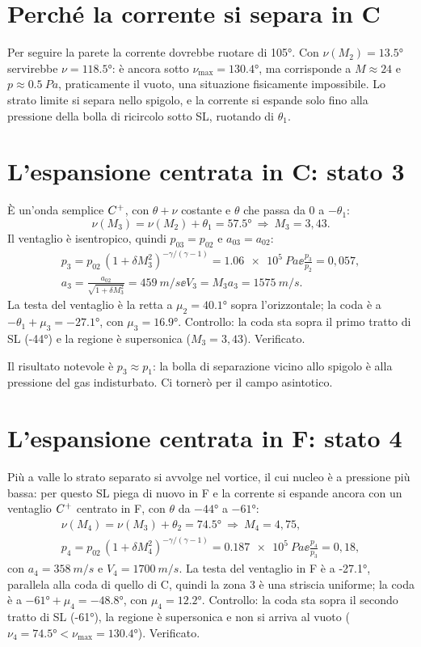 \section*{Perché la corrente si separa in C}
Per seguire la parete la corrente dovrebbe ruotare di \ang{105}. Con $\nu(M_2)=\ang{13.5}$ servirebbe
$\nu=\ang{118.5}$: è ancora sotto $\nu_{\max}=\ang{130.4}$, ma corrisponde a $M\approx24$ e $p\approx\SI{0.5}{Pa}$,
praticamente il vuoto, una situazione fisicamente impossibile. Lo strato limite si separa nello spigolo, e la
corrente si espande solo fino alla pressione della bolla di ricircolo sotto SL, ruotando di $\theta_1$.

\section*{L'espansione centrata in C: stato 3}
È un'onda semplice $C^{+}$, con $\theta+\nu$ costante e $\theta$ che passa da 0 a $-\theta_1$:
\[
\nu(M_3)=\nu(M_2)+\theta_1=\ang{57.5}\ \Rightarrow\ M_3=3{,}43 .
\]
Il ventaglio è isentropico, quindi $p_{03}=p_{02}$ e $a_{03}=a_{02}$:
\begin{gather*}
p_3=p_{02}\,(1+\delta M_3^2)^{-\gamma/(\gamma-1)}=\SI{1.06e5}{Pa} \ee \frac{p_3}{p_2}=0{,}057,\\
a_3=\frac{a_{02}}{\sqrt{1+\delta M_3^2}}=\SI{459}{m/s} \ee V_3=M_3a_3=\SI{1575}{m/s}.
\end{gather*}
La testa del ventaglio è la retta a $\mu_2=\ang{40.1}$ sopra l'orizzontale; la coda è a
$-\theta_1+\mu_3=\ang{-27.1}$, con $\mu_3=\ang{16.9}$. Controllo: la coda sta sopra il primo tratto di SL
(\ang{-44}) e la regione è supersonica ($M_3=3{,}43$). Verificato.

Il risultato notevole è $p_3\approx p_1$: la bolla di separazione vicino allo spigolo è alla pressione del gas
indisturbato. Ci tornerò per il campo asintotico.

\section*{L'espansione centrata in F: stato 4}
Più a valle lo strato separato si avvolge nel vortice, il cui nucleo è a pressione più bassa: per questo SL piega di
nuovo in F e la corrente si espande ancora con un ventaglio $C^{+}$ centrato in F, con $\theta$ da $-\ang{44}$ a
$-\ang{61}$:
\begin{gather*}
\nu(M_4)=\nu(M_3)+\theta_2=\ang{74.5}\ \Rightarrow\ M_4=4{,}75,\\
p_4=p_{02}\,(1+\delta M_4^2)^{-\gamma/(\gamma-1)}=\SI{0.187e5}{Pa} \ee \frac{p_4}{p_3}=0{,}18,
\end{gather*}
con $a_4=\SI{358}{m/s}$ e $V_4=\SI{1700}{m/s}$. La testa del ventaglio in F è a \ang{-27.1}, parallela alla coda di
quello di C, quindi la zona 3 è una striscia uniforme; la coda è a $-\ang{61}+\mu_4=\ang{-48.8}$, con
$\mu_4=\ang{12.2}$. Controllo: la coda sta sopra il secondo tratto di SL (\ang{-61}), la regione è supersonica e
non si arriva al vuoto ($\nu_4=\ang{74.5}<\nu_{\max}=\ang{130.4}$). Verificato.

